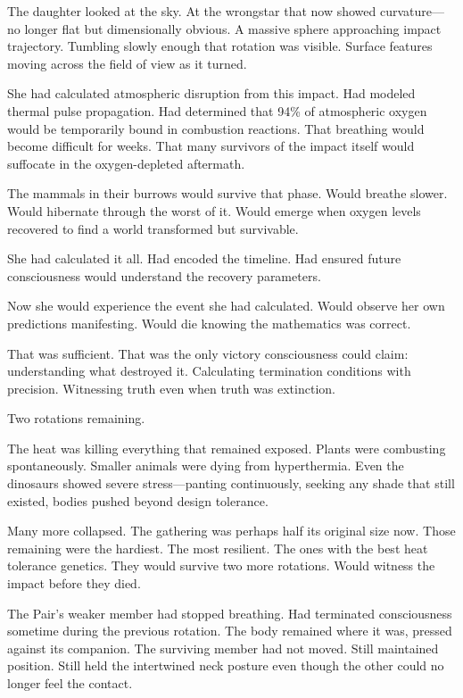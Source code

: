 The daughter looked at the sky. At the wrongstar that now showed curvature—no longer flat but dimensionally obvious. A massive sphere approaching impact trajectory. Tumbling slowly enough that rotation was visible. Surface features moving across the field of view as it turned.

She had calculated atmospheric disruption from this impact. Had modeled thermal pulse propagation. Had determined that 94\% of atmospheric oxygen would be temporarily bound in combustion reactions. That breathing would become difficult for weeks. That many survivors of the impact itself would suffocate in the oxygen-depleted aftermath.

The mammals in their burrows would survive that phase. Would breathe slower. Would hibernate through the worst of it. Would emerge when oxygen levels recovered to find a world transformed but survivable.

She had calculated it all. Had encoded the timeline. Had ensured future consciousness would understand the recovery parameters.

Now she would experience the event she had calculated. Would observe her own predictions manifesting. Would die knowing the mathematics was correct.

That was sufficient. That was the only victory consciousness could claim: understanding what destroyed it. Calculating termination conditions with precision. Witnessing truth even when truth was extinction.

\scenebreak

Two rotations remaining.

The heat was killing everything that remained exposed. Plants were combusting spontaneously. Smaller animals were dying from hyperthermia. Even the dinosaurs showed severe stress—panting continuously, seeking any shade that still existed, bodies pushed beyond design tolerance.

Many more collapsed. The gathering was perhaps half its original size now. Those remaining were the hardiest. The most resilient. The ones with the best heat tolerance genetics. They would survive two more rotations. Would witness the impact before they died.

The Pair's weaker member had stopped breathing. Had terminated consciousness sometime during the previous rotation. The body remained where it was, pressed against its companion. The surviving member had not moved. Still maintained position. Still held the intertwined neck posture even though the other could no longer feel the contact.

